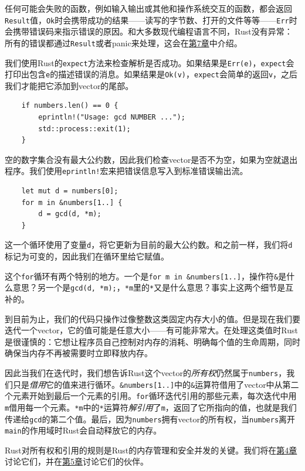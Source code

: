 任何可能会失败的函数，例如输入输出或其他和操作系统交互的函数，都会返回\texttt{Result}值，\texttt{Ok}时会携带成功的结果——读写的字节数、打开的文件等等——\texttt{Err}时会携带错误码来指示错误的原因。和大多数现代编程语言不同，Rust没有异常：所有的错误都通过\texttt{Result}或者panic来处理，这会在\hyperref[ch07]{第7章}中介绍。

我们使用Rust的\texttt{expect}方法来检查解析是否成功。如果结果是\texttt{Err(e)}，\texttt{expect}会打印出包含\texttt{e}的描述错误的消息。如果结果是\texttt{Ok(v)}，\texttt{expect}会简单的返回\texttt{v}，之后我们才能把它添加到vector的尾部。

\begin{verbatim}
    if numbers.len() == 0 {
        eprintln!("Usage: gcd NUMBER ...");
        std::process::exit(1);
    }
\end{verbatim}

空的数字集合没有最大公约数，因此我们检查vector是否不为空，如果为空就退出程序。我们使用\texttt{eprintln!}宏来把错误信息写入到标准错误输出流。

\begin{verbatim}
    let mut d = numbers[0];
    for m in &numbers[1..] {
        d = gcd(d, *m);
    }
\end{verbatim}

这一个循环使用了变量\texttt{d}，将它更新为目前的最大公约数。和之前一样，我们将\texttt{d}标记为可变的，因此我们在循环里给它赋值。

这个\texttt{for}循环有两个特别的地方。一个是\texttt{for m in \&numbers[1..]}，操作符\texttt{\&}是什么意思？另一个是\texttt{gcd(d, *m);}，\texttt{*m}里的\texttt{*}又是什么意思？事实上这两个细节是互补的。

到目前为止，我们的代码只操作过像整数这类固定内存大小的值。但是现在我们要迭代一个vector，它的值可能是任意大小——有可能非常大。在处理这类值时Rust是很谨慎的：它想让程序员自己控制对内存的消耗、明确每个值的生命周期，同时确保当内存不再被需要时立即释放内存。

因此当我们在迭代时，我们想告诉Rust这个vector的\emph{所有权}仍然属于\texttt{numbers}，我们只是\emph{借用}它的值来进行循环。\texttt{\&numbers[1..]}中的\texttt{\&}运算符借用了vector中从第二个元素开始到最后一个元素的引用。\texttt{for}循环迭代引用的那些元素，每次迭代中用\texttt{m}借用每一个元素。\texttt{*m}中的\texttt{*}运算符\emph{解引用}了\texttt{m}，返回了它所指向的值，也就是我们传递给\texttt{gcd}的第二个值。最后，因为\texttt{numbers}拥有vector的所有权，当\texttt{numbers}离开\texttt{main}的作用域时Rust会自动释放它的内存。

Rust对所有权和引用的规则是Rust的内存管理和安全并发的关键。我们将在\hyperref[ch04]{第4章}讨论它们，并在\hyperref[ch05]{第5章}讨论它们的伙伴。

